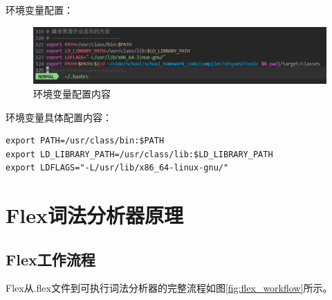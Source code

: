 \documentclass[twocolumn]{article}
\begin{document}
环境变量配置：
\begin{figure}[H]
    \centering
    \includegraphics[width=0.9\linewidth]{env.png}
    \caption{环境变量配置内容}
    \label{fig:env_config}
\end{figure}

环境变量具体配置内容：
\begin{verbatim}
export PATH=/usr/class/bin:$PATH
export LD_LIBRARY_PATH=/usr/class/lib:$LD_LIBRARY_PATH  
export LDFLAGS="-L/usr/lib/x86_64-linux-gnu/"
\end{verbatim}

\section{Flex词法分析器原理}

\subsection{Flex工作流程}

Flex从.flex文件到可执行词法分析器的完整流程如图\ref{fig:flex_workflow}所示。
\end{document}
